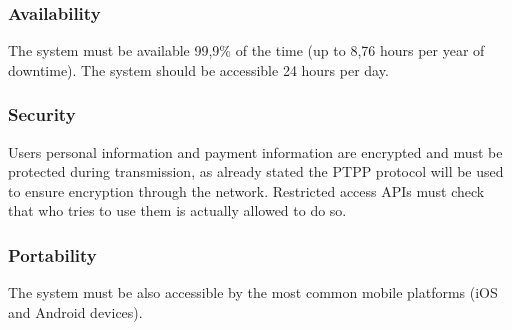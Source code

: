 	\subsubsection{Availability}
	The system must be available 99,9\% of the time (up to 8,76 hours per year of downtime). The system should be accessible 24 hours per day.
	\subsubsection{Security}
	Users personal information and payment information are encrypted and must be protected during transmission, as already stated the PTPP protocol will be used to ensure encryption through the network.
	Restricted access APIs must check that who tries to use them is actually allowed to do so.
	\subsubsection{Portability}
	The system must be also accessible by the most common mobile platforms (iOS and Android devices).

